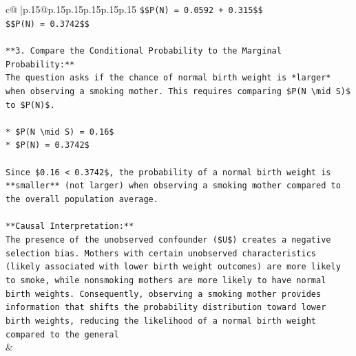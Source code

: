 \documentclass{article}
\begin{document}
{\begin{supertabular}{c@{$\;$}|p{.15\linewidth}@{}p{.15\linewidth}p{.15\linewidth}p{.15\linewidth}p{.15\linewidth}p{.15\linewidth}}
{{{\texttt{\$\$P(N) = 0.0592 + 0.315\$\$} \\
\texttt{\$\$P(N) = 0.3742\$\$} \\
\\ 
\texttt{**3. Compare the Conditional Probability to the Marginal Probability:**} \\
\texttt{The question asks if the chance of normal birth weight is *larger* when observing a smoking mother. This requires comparing \$P(N \textbackslash{}mid S)\$ to \$P(N)\$.} \\
\\ 
\texttt{*   \$P(N \textbackslash{}mid S) = 0.16\$} \\
\texttt{*   \$P(N) = 0.3742\$} \\
\\ 
\texttt{Since \$0.16 < 0.3742\$, the probability of a normal birth weight is **smaller** (not larger) when observing a smoking mother compared to the overall population average.} \\
\\ 
\texttt{**Causal Interpretation:**} \\
\texttt{The presence of the unobserved confounder (\$U\$) creates a negative selection bias. Mothers with certain unobserved characteristics (likely associated with lower birth weight outcomes) are more likely to smoke, while nonsmoking mothers are more likely to have normal birth weights. Consequently, observing a smoking mother provides information that shifts the probability distribution toward lower birth weights, reducing the likelihood of a normal birth weight compared to the general} \\
            }
        }
    }
    & \\ \\


\end{supertabular}}
\end{document}
